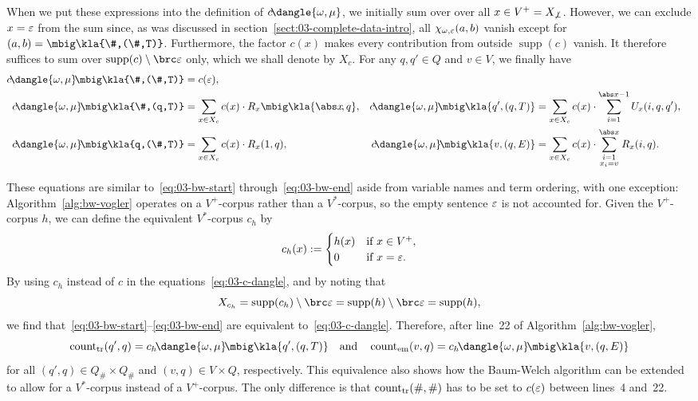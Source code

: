 When we put these expressions into the definition of $c\!\dangle{\omega,\mu}$,
we initially sum over over all $x\in V^+ = X_{\not\bot}$. However, we can
exclude $x=\varepsilon$ from the sum since, as was discussed in
section~\ref{sect:03-complete-data-intro}, all $\chi_{\omega,\varepsilon}(a,b)$ vanish
except for $(a,b) = \mbig\kla{\#,(\#,T)}$. Furthermore, the factor $c(x)$ makes
every contribution from outside $\operatorname{supp}(c)$ vanish. It therefore
suffices to sum over $\operatorname{supp}(c)\setminus\brc\eps$ only, which we
shall denote by $X_c$.  For any $q,q'\in Q$ and $v\in V$, we finally have
\begin{align}\label{eq:03-c-dangle}
 c\!\dangle{\omega,\mu}\!\mbig\kla{\#,(\#,T)} &= c(\eps), \\
 c\!\dangle{\omega,\mu}\!\mbig\kla{\#,(q,T)} &= \sum_{x\in X_c} c(x) \cdot R_x\mbig\kla{\abs x\!,q}, &
 c\!\dangle{\omega,\mu}\!\mbig\kla{q',(q,T)} &= \sum_{x\in X_c} c(x) \cdot \sum_{i=1}^{\abs x-1} U_x(i,q,q'), \nonumber\\
 c\!\dangle{\omega,\mu}\!\mbig\kla{q,(\#,T)} &= \sum_{x\in X_c} c(x) \cdot R_x(1,q), &
 c\!\dangle{\omega,\mu}\!\mbig\kla{v,(q,E)} &= \sum_{x\in X_c} c(x) \cdot \sum_{{\scriptstyle i=1}\atop{\scriptstyle x_i=v}}^{\abs x} R_x(i,q). \nonumber
\end{align}

These equations are similar to~\eqref{eq:03-bw-start}
through~\eqref{eq:03-bw-end} aside from variable names and term ordering, with
one exception: Algorithm~\ref{alg:bw-vogler} operates on a $V^+$-corpus rather
than a $V^*$-corpus, so the empty sentence $\varepsilon$ is not accounted for. Given
the $V^+$-corpus $h$, we can define the equivalent $V^*$-corpus $c_h$ by
\[
 c_h(x) := \begin{cases}
  h(x) &\text{if } x\in V^+, \\
  0 & \text{if } x=\varepsilon.
 \end{cases}
\]
By using $c_h$ instead of $c$ in the equations~\eqref{eq:03-c-dangle}, and by noting that
\[
 X_{c_h} = \operatorname{supp}(c_h)\setminus\brc\eps = \operatorname{supp}(h)\setminus\brc\eps = \operatorname{supp}(h),
\]
we find that~\eqref{eq:03-bw-start}--\eqref{eq:03-bw-end} are equivalent
to~\eqref{eq:03-c-dangle}. Therefore, after line~22 of
Algorithm~\ref{alg:bw-vogler},
\begin{equation}\label{eq:03-cnt-by-c}
 \cnt_\mathrm{tr}(q',q) = c_h\!\dangle{\omega,\mu}\!\mbig\kla{q',(q,T)}
 \quad\text{and}\quad
 \cnt_\mathrm{em}(v,q) = c_h\!\dangle{\omega,\mu}\!\mbig\kla{v,(q,E)}
\end{equation}
for all $(q',q)\in Q_\#\times Q_\#$ and $(v,q)\in V\times Q$, respectively. This equivalence
also shows how the Baum-Welch algorithm can be extended to allow for a
$V^*$-corpus instead of a $V^+$-corpus. The only difference is that
$\operatorname{count}_\mathrm{tr}(\#,\#)$ has to be set to $c(\varepsilon)$ between lines~4 and~22.

